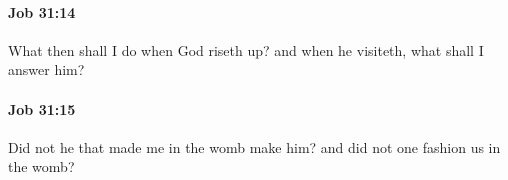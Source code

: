 		\paragraph{Job 31:14} %
			\label{JOB-31-14}

			What then shall I do when God riseth up? and when he visiteth, what shall I answer him?


		\paragraph{Job 31:15} %
			\label{JOB-31-15}

			Did not he that made me in the womb make him? and did not one fashion us in the womb?


